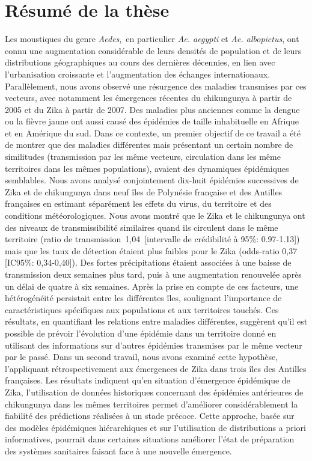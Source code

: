 \clearpage
\chapter*{Résumé de la thèse}
\vspace{2em}\doublespacing

Les moustiques du genre \textit{Aedes}, en particulier \textit{Ae. aegypti} et \textit{Ae. albopictus}, ont connu une augmentation considérable de leurs densités de population et de leurs distributions géographiques au cours des dernières décennies, en lien avec l’urbanisation croissante et l’augmentation des échanges internationaux. 
Parallèlement, nous avons observé une résurgence des maladies transmises par ces vecteurs, avec notamment les émergences récentes du chikungunya à partir de 2005 et du Zika à  partir de 2007.
Des maladies plus anciennes comme la dengue ou la fièvre jaune ont aussi causé des épidémies de taille inhabituelle en Afrique et en Amérique du sud.
Dans ce contexte, un premier objectif de ce travail a été de montrer que des maladies différentes mais présentant un certain nombre de similitudes (transmission par les même vecteurs, circulation dans les même territoires dans les mêmes populations), avaient des dynamiques épidémiques semblables.
Nous avons analysé conjointement dix-huit épidémies successives de Zika et de chikungunya dans neuf îles de Polynésie française et des Antilles françaises en estimant séparément les effets du virus, du territoire et des conditions météorologiques. 
Nous avons montré que le Zika et le chikungunya ont des niveaux de transmissibilité similaires quand ils circulent dans le même territoire (ratio de transmission 1,04 [intervalle de crédibilité à 95\%: 0.97-1.13]) mais que les taux de détection étaient plus faibles pour le Zika (odds-ratio 0,37 [IC95\%: 0,34-0,40]). 
Des fortes précipitations étaient associées à une baisse de transmission deux semaines plus tard, puis à une augmentation renouvelée après un délai de quatre à six semaines. 
Après la prise en compte de ces facteurs, une hétérogénéité persistait entre les différentes îles, soulignant l'importance de caractéristiques spécifiques aux populations et aux territoires touchés.
Ces résultats, en quantifiant les relations entre maladies différentes, suggèrent qu'il est possible de prévoir l'évolution d'une épidémie dans un territoire donné en utilisant des informations sur d'autres épidémies transmises par le même vecteur par le passé. 
Dans un second travail, nous avons examiné cette hypothèse, l'appliquant rétrospectivement aux émergences de Zika dans trois îles des Antilles françaises.
Les résultats indiquent qu'en situation d’émergence épidémique de Zika, l’utilisation de données historiques concernant des épidémies antérieures de chikungunya dans les mêmes territoires permet d’améliorer considérablement la fiabilité des prédictions réalisées à un stade précoce.
Cette approche, basée sur des modèles épidémiques hiérarchiques et sur l'utilisation de distributions a priori informatives, pourrait dans certaines situations améliorer l'état de préparation des systèmes sanitaires faisant face à une nouvelle émergence.

